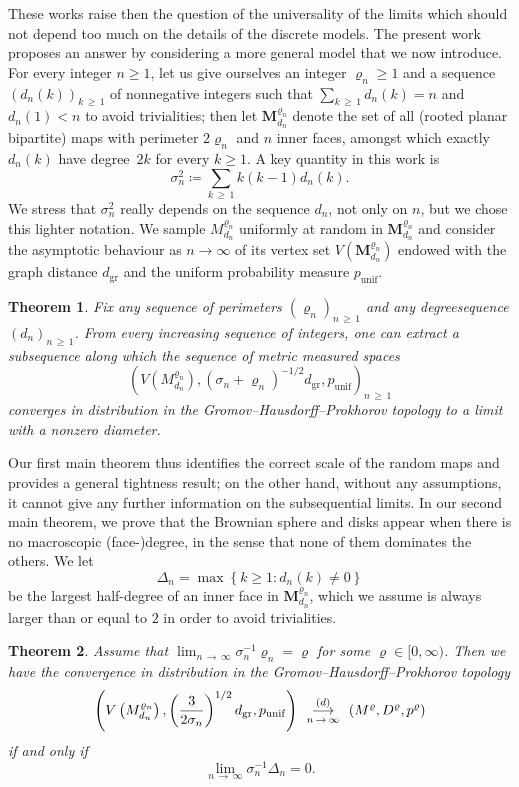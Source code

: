 \documentclass[10pt]{amsart}
\newtheorem{theo}{Theorem}[section]
\theoremstyle{definition}\newtheorem{defi}[theo]{Definition}\newtheorem{rema}[theo]{Remark}\newtheorem{exam}[theo]{Example}\newtheorem{exem}[theo]{Example}\newtheorem{nota}[theo]{Notation}
\newcommand{\1}{\ensembles{1}}
\newcommand{\Map}{\mathbf{M}}
\renewcommand{\ge}{\geqslant}
\newcommand{\Bmap}{M}
\newcommand{\dBmap}{D}
\newcommand{\pBmap}{p}
\newcommand{\Mn}{\Map_{d_n}^{\varrho_n}}
\newcommand{\mn}{M_{d_n}^{\varrho_n}}
\newcommand{\dgr}{d_{\mathrm{gr}}}
\newcommand{\pgr}{p_{\mathrm{unif}}}
\newcommand{\Vmn}{V(M_{d_n}^{\varrho_n})}
\newcommand{\cvloi}[1][n]{\enskip\mathop{\longrightarrow}^{(d)}_{#1\,\to\, \infty}\enskip}
\providecommand{\?}{}
\begin{document}
These works raise then the question of the universality of the limits which should not depend too much on the details of the discrete models. The present work proposes an answer by considering a more general model that we now introduce. For every integer $n \ge 1$, let us give ourselves an integer $\varrho_n \ge 1$ and a sequence $(d_n(k))_{k \,\ge\,1}$ of nonnegative integers such that $\sum_{k\,\ge\,1} d_n(k) = n$ and $d_n(1) < n$ to avoid trivialities; then let $\Mn$ denote the set of all (rooted planar bipartite) maps with perimeter $2 \varrho_n$ and $n$ inner faces, amongst which exactly $d_n(k)$ have degree~$2k$ for every $k \ge 1$. A key quantity in this work is
\[
\sigma_n^2 \coloneqq \sum_{k\,\ge\,1} k (k-1) d_n(k).
\]
We stress that $\sigma_n^2$ really depends on the sequence $d_{n}$, not only on $n$, but we chose this lighter notation. We sample $\mn$ uniformly at random in $\Mn$ and consider the asymptotic behaviour as $n \to \infty$ of its vertex set $V(\Mn)$ endowed with the graph distance $\dgr$ and the uniform probability measure $\pgr$.


\begin{theo}\label{thm:tension_cartes}
Fix any sequence of perimeters $(\varrho_n)_{n\,\ge\,1}$ and any degree\linebreak sequence $(d_n)_{n\,\ge\,1}$. From every increasing sequence of integers, one can extract a subsequence along which the sequence of metric measured spaces
\[
\left(\Vmn, \left(\sigma_n + \varrho_n\right)^{-1/2} \dgr, \pgr\right)_{n\,\ge\,1}
\]
converges in distribution in the Gromov--Hausdorff--Prokhorov topology to a limit with a nonzero diameter.
\end{theo}



Our first main theorem thus identifies the correct scale of the random maps and provides a general tightness result; on the other hand, without any assumptions, it cannot give any further information on the subsequential limits. In our second main theorem, we prove that the Brownian sphere and disks appear when there is no macroscopic (face-)degree, in the sense that none of them dominates the others. We let
\[
\Delta_n = \max\left\{k \ge 1 : d_n(k) \ne 0\right\}
\]
be the largest half-degree of an inner face in $\Mn$, which we assume is always larger than or equal to $2$ in order to avoid trivialities.



\begin{theo}\label{thm:convergence_carte_disque}
Assume that $\lim_{n\,\to\,\infty} \sigma_n^{-1} \varrho_n = \varrho$ for some $\varrho \in [0,\infty)$. Then we have the convergence in distribution in the Gromov--Hausdorff--Prokhorov topology
\[
\left(V\left(\mn\right), \left(\frac{3}{2 \sigma_n}\right)^{1/2} \dgr, \pgr\right) \cvloi \left(\Bmap^\varrho,\dBmap^\varrho, \pBmap^\varrho\right)
\]
if and only if
\[
\lim_{n\,\to\,\infty} \sigma_n^{-1} \Delta_n = 0.
\]
\end{theo}
\end{document}
